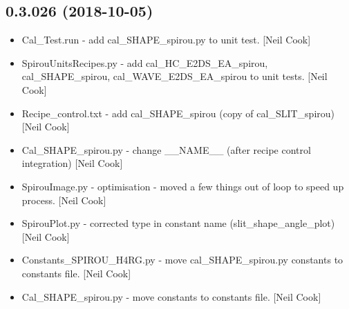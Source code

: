 \documentclass[a4paper,10pt,english]{report}
\begin{document}
\subsection{0.3.026 (2018-10-05)}
\label{\detokenize{misc/changelog:id304}}\begin{itemize}
\item {} 
Cal\_Test.run - add cal\_SHAPE\_spirou.py to unit test. {[}Neil Cook{]}

\item {} 
SpirouUnitsRecipes.py - add cal\_HC\_E2DS\_EA\_spirou, cal\_SHAPE\_spirou,
cal\_WAVE\_E2DS\_EA\_spirou to unit tests. {[}Neil Cook{]}

\item {} 
Recipe\_control.txt - add cal\_SHAPE\_spirou (copy of cal\_SLIT\_spirou)
{[}Neil Cook{]}

\item {} 
Cal\_SHAPE\_spirou.py - change \_\_NAME\_\_ (after recipe control
integration) {[}Neil Cook{]}

\item {} 
SpirouImage.py - optimisation - moved a few things out of loop to
speed up process. {[}Neil Cook{]}

\item {} 
SpirouPlot.py - corrected type in constant name
(slit\_shape\_angle\_plot) {[}Neil Cook{]}

\item {} 
Constants\_SPIROU\_H4RG.py - move cal\_SHAPE\_spirou.py constants to
constants file. {[}Neil Cook{]}

\item {} 
Cal\_SHAPE\_spirou.py - move constants to constants file. {[}Neil Cook{]}

\end{itemize}
\end{document}
